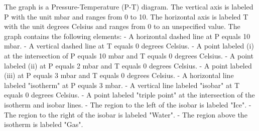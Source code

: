 The graph is a Pressure-Temperature (P-T) diagram. The vertical axis is labeled P with the unit mbar and ranges from 0 to 10. The horizontal axis is labeled T with the unit degrees Celsius and ranges from 0 to an unspecified value. The graph contains the following elements:
- A horizontal dashed line at P equals 10 mbar.
- A vertical dashed line at T equals 0 degrees Celsius.
- A point labeled (i) at the intersection of P equals 10 mbar and T equals 0 degrees Celsius.
- A point labeled (ii) at P equals 2 mbar and T equals 0 degrees Celsius.
- A point labeled (iii) at P equals 3 mbar and T equals 0 degrees Celsius.
- A horizontal line labeled "isotherm" at P equals 3 mbar.
- A vertical line labeled "isobar" at T equals 0 degrees Celsius.
- A point labeled "triple point" at the intersection of the isotherm and isobar lines.
- The region to the left of the isobar is labeled "Ice".
- The region to the right of the isobar is labeled "Water".
- The region above the isotherm is labeled "Gas".